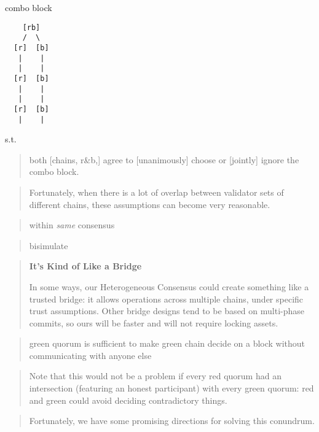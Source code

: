 \documentclass{article}
\theoremstyle{definition}
\begin{document}
combo block

\begin{verbatim}
    [rb]
    /  \ 
  [r]  [b]
   |    |
   |    |
  [r]  [b]
   |    |
   |    |
  [r]  [b]
   |    |
\end{verbatim}

s.t.

\begin{quote}
  both [chains, r\&b,] agree to [unanimously] choose or [jointly] ignore the combo block.
\end{quote}

\begin{quote}
  Fortunately, 
  when there is a lot of overlap between
  validator sets of different chains, 
  these assumptions can become very reasonable.
\end{quote}

\begin{quote}
  within \emph{same} consensus
\end{quote}

\begin{quote}
  bisimulate
\end{quote}

\begin{quote}
  \textbf{It's Kind of Like a Bridge}

  In some ways, 
  our Heterogeneous Consensus could create something like 
  a trusted bridge: 
  it allows operations across multiple chains,
  under specific trust assumptions. 
  Other bridge designs tend to be based on multi-phase commits,
  so ours will be faster and will not require locking assets.
\end{quote}

\begin{quote}
  green quorum is sufficient to make green chain decide on a block without communicating with anyone else
\end{quote}

 \begin{quote}
   Note that this would not be a problem if every red quorum had an intersection (featuring an honest participant) with every green quorum: red and green could avoid deciding contradictory things.
 \end{quote}

 \begin{quote}
    Fortunately, we have some promising directions for solving this conundrum.
  \end{quote}
\end{document}
